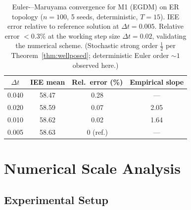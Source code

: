 \documentclass[review,12pt]{elsarticle}
\begin{document}
\begin{table}[htbp]
  \caption{Euler-–Maruyama convergence for M1 (EGDM) on ER topology
           ($n=100$, 5 seeds, deterministic, $T=15$).
           IEE error relative to reference solution at $\Delta t = 0.005$.
           Relative error $<0.3\%$ at the working step size $\Delta t=0.02$,
           validating the numerical scheme.
           (Stochastic strong order $\tfrac{1}{2}$ per Theorem~\ref{thm:wellposed};
           deterministic Euler order $\sim 1$ observed here.)}
  \label{tab:em_conv}
  \centering
  \small
  \renewcommand{\arraystretch}{1.15}
  \begin{tabular}{cccc}
    \toprule
    $\Delta t$ & IEE mean & Rel.\ error (\%) & Empirical slope \\
    \midrule
    0.040 & 58.47 & 0.28 & --- \\
    0.020 & 58.59 & 0.07 & 2.05 \\
    0.010 & 58.62 & 0.02 & 1.64 \\
    0.005 & 58.63 & 0 (ref.) & --- \\
    \bottomrule
  \end{tabular}
\end{table}

\section{Numerical Scale Analysis}
\label{sec:results}

\subsection{Experimental Setup}
\end{document}
